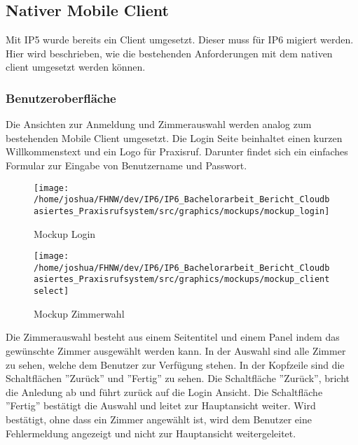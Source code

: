 \subsection{Nativer Mobile Client}

Mit IP5 wurde bereits ein Client umgesetzt.
Dieser muss für IP6 migiert werden.
Hier wird beschrieben, wie die bestehenden Anforderungen mit dem nativen client umgesetzt werden können.

\subsubsection*{Benutzeroberfläche}

Die Ansichten zur Anmeldung und Zimmerauswahl werden analog zum bestehenden Mobile Client umgesetzt.
Die Login Seite beinhaltet einen kurzen Willkommenstext und ein Logo für Praxisruf.
Darunter findet sich ein einfaches Formular zur Eingabe von Benutzername und Passwort.

\begin{figure}[h]
    \centering
    \begin{minipage}[b]{0.4\textwidth}
        \texttt{[image: /home/joshua/FHNW/dev/IP6/IP6\_Bachelorarbeit\_Bericht\_Cloudbasiertes\_Praxisrufsystem/src/graphics/mockups/mockup\_login]}
        \caption{Mockup Login}
    \end{minipage}
    \hfill
    \begin{minipage}[b]{0.4\textwidth}
        \texttt{[image: /home/joshua/FHNW/dev/IP6/IP6\_Bachelorarbeit\_Bericht\_Cloudbasiertes\_Praxisrufsystem/src/graphics/mockups/mockup\_clientselect]}
        \caption{Mockup Zimmerwahl}
    \end{minipage}\label{fig:Mockups-Login-ClientSelection}
\end{figure}

Die Zimmerauswahl besteht aus einem Seitentitel und einem Panel indem das gewünschte Zimmer ausgewählt werden kann.
In der Auswahl sind alle Zimmer zu sehen, welche dem Benutzer zur Verfügung stehen.
In der Kopfzeile sind die Schaltflächen ''Zurück'' und ''Fertig'' zu sehen.
Die Schaltfläche ''Zurück'', bricht die Anledung ab und führt zurück auf die Login Ansicht.
Die Schaltfläche ''Fertig'' bestätigt die Auswahl und leitet zur Hauptansicht weiter.
Wird bestätigt, ohne dass ein Zimmer angewählt ist, wird dem Benutzer eine Fehlermeldung angezeigt und nicht zur Hauptansicht weitergeleitet.

\clearpage

